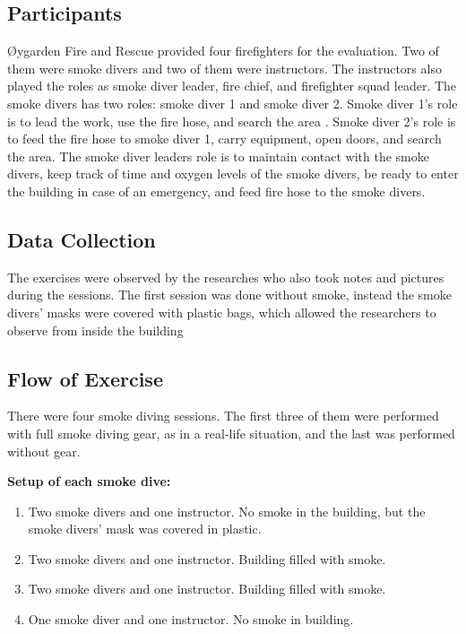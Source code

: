 \documentclass[../Main/thesis.tex]{subfiles}
\begin{document}
\subsection{Participants}
Øygarden Fire and Rescue provided four firefighters for the evaluation.
Two of them were smoke divers and two of them were instructors.
The instructors also played the roles as smoke diver leader, fire chief, and firefighter squad leader.
The smoke divers has two roles: smoke diver 1 and smoke diver 2.
Smoke diver 1's role is to lead the work, use the fire hose, and search the area \citep{Direktoratetforsamfunnssikkerhetogberedskap1994}.
Smoke diver 2's role is to feed the fire hose to smoke diver 1, carry equipment, open doors, and search the area.%
The smoke diver leaders role is to maintain contact with the smoke divers, keep track of time and oxygen levels of the smoke divers, be ready to enter the building in case of an emergency, and feed fire hose to the smoke divers.

\subsection{Data Collection}
The exercises were observed by the researches who also took notes and pictures during the sessions. 
The first session was done without smoke, instead the smoke divers' masks were covered with plastic bags, which allowed the researchers to observe from inside the building

\subsection{Flow of Exercise}
There were four smoke diving sessions.
The first three of them were performed with full smoke diving gear, as in a real-life situation, and the last was performed without gear.

\textbf{Setup of each smoke dive:}
\begin{enumerate}
	\item Two smoke divers and one instructor. No smoke in the building, but the smoke divers' mask was covered in plastic.
	\item Two smoke divers and one instructor. Building filled with smoke.
	\item Two smoke divers and one instructor. Building filled with smoke.
	\item One smoke diver and one instructor. No smoke in building.
\end{enumerate}
\end{document}
